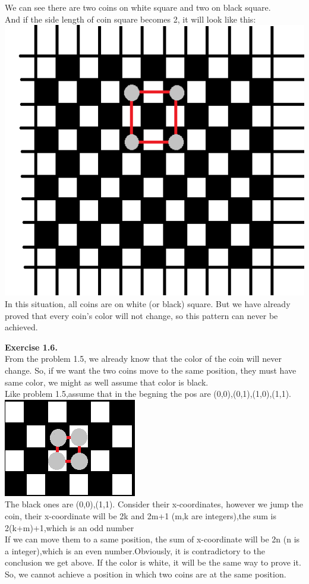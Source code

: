 \documentclass{article}
\begin{document}
\begin{flushleft}
We can see there are two coins on white square and two on black square.\\
And if the side length of coin square becomes 2, it will look like this:
\includegraphics[scale=0.8]{1_5_3.png}\\
In this situation, all coins are on white (or black) square. 
But we have already proved that every coin's color will not change, so this pattern can never be achieved.

\textbf{Exercise 1.6.} \\
From the problem 1.5, we already know that the color of the coin will never change. So, if we want the two coins move to the same position, they must have same color, we might as well assume that color is black.\\
Like problem 1.5,assume that in the begning the pos are (0,0),(0,1),(1,0),(1,1).\\
        \includegraphics[scale=1]{1_6_1.png}\\
The black ones are (0,0),(1,1). Consider their x-coordinates, however we jump the coin, their x-coordinate will be 2k and 2m+1 (m,k are integers),the sum is 2(k+m)+1,which is an odd number\\
If we can move them to a same position, the sum of x-coordinate will be 2n (n is a integer),which is an even number.Obviously, it is contradictory to the conclusion we get above. If the color is white, it will be the same way to prove it.\\
So, we cannot achieve a position in which two coins are at the same position.\\



\end{flushleft}
\end{document}
